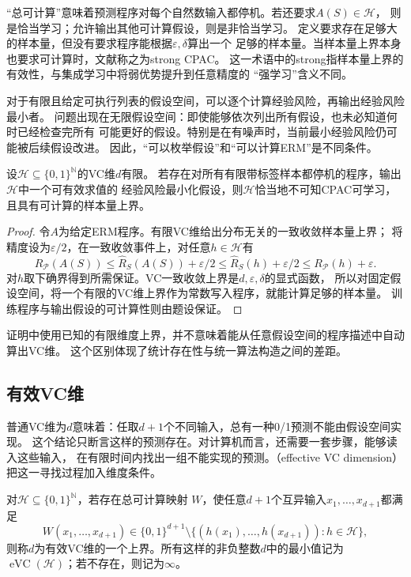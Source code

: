 “总可计算”意味着预测程序对每个自然数输入都停机。若还要求$A(S)\in\mathcal H$，
则是恰当学习；允许输出其他可计算假设，则是非恰当学习。
定义要求存在足够大的样本量，但没有要求程序能根据$\varepsilon,\delta$算出一个
足够的样本量。当样本量上界本身也要求可计算时，文献称之为strong CPAC。
这一术语中的strong指样本量上界的有效性，与集成学习中将弱优势提升到任意精度的
“强学习”含义不同。

对于有限且给定可执行列表的假设空间，可以逐个计算经验风险，再输出经验风险最小者。
问题出现在无限假设空间：即使能够依次列出所有假设，也未必知道何时已经检查完所有
可能更好的假设。特别是在有噪声时，当前最小经验风险仍可能被后续假设改进。
因此，“可以枚举假设”和“可以计算ERM”是不同条件。

\begin{theorem}[可计算ERM给出的学习保证]
\label{thm:computable-erm-pac}
设$\mathcal H\subseteq\{0,1\}^{\mathbb N}$的VC维$d$有限。
若存在对所有有限带标签样本都停机的程序，输出$\mathcal H$中一个可有效求值的
经验风险最小化假设，则$\mathcal H$恰当地不可知CPAC可学习，且具有可计算的样本量上界。
\end{theorem}

\begin{proof}
令$A$为给定ERM程序。有限VC维给出分布无关的一致收敛样本量上界；
将精度设为$\varepsilon/2$，在一致收敛事件上，对任意$h\in\mathcal H$有
\[
 R_{\mathcal P}(A(S))
 \leq\hat R_S(A(S))+\varepsilon/2
 \leq\hat R_S(h)+\varepsilon/2
 \leq R_{\mathcal P}(h)+\varepsilon.
\]
对$h$取下确界得到所需保证。VC一致收敛上界是$d,\varepsilon,\delta$的显式函数，
所以对固定假设空间，将一个有限的VC维上界作为常数写入程序，就能计算足够的样本量。
训练程序与输出假设的可计算性则由题设保证。
\end{proof}

证明中使用已知的有限维度上界，并不意味着能从任意假设空间的程序描述中自动算出VC维。
这个区别体现了统计存在性与统一算法构造之间的差距。

\subsection{有效VC维}

普通VC维为$d$意味着：任取$d+1$个不同输入，总有一种0/1预测不能由假设空间实现。
这个结论只断言这样的预测存在。对计算机而言，还需要一套步骤，能够读入这些输入，
在有限时间内找出一组不能实现的预测。（effective VC dimension）
把这一寻找过程加入维度条件。

\begin{definition}[有效VC维]
\label{def:effective-vc-dimension}
对$\mathcal H\subseteq\{0,1\}^{\mathbb N}$，若存在总可计算映射
$W$，使任意$d+1$个互异输入$x_1,\ldots,x_{d+1}$都满足
\[
 W(x_1,\ldots,x_{d+1})\in\{0,1\}^{d+1}
 \setminus\{(h(x_1),\ldots,h(x_{d+1})):h\in\mathcal H\},
\]
则称$d$为有效VC维的一个上界。所有这样的非负整数$d$中的最小值记为
$\operatorname{eVC}(\mathcal H)$；若不存在，则记为$\infty$。
\end{definition}

